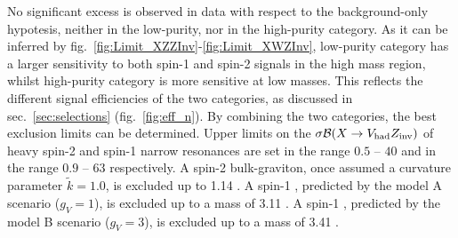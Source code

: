 \noindent No significant excess is observed in data with respect to the background-only hypotesis, neither in the low-purity, nor in the high-purity category. As it can be inferred by fig.~\ref{fig:Limit_XZZInv}-\ref{fig:Limit_XWZInv}, low-purity category has a larger sensitivity to both spin-1 and spin-2 signals in the high mass region, whilst high-purity category is more sensitive at low masses. This reflects the different signal efficiencies of the two categories, as discussed in sec.~\ref{sec:selections} (fig.~\ref{fig:eff_n}). By combining the two categories, the best exclusion limits can be determined. Upper limits on the $\sigma \mathcal{B} (X \rightarrow V_{\text{had}} Z_{\text{inv}})$ of heavy spin-2 and spin-1 narrow resonances are set in the range $0.5$ -- $40$ \fb and in the range $0.9$ -- $63$ \fb respectively. A spin-2 bulk-graviton, once assumed a curvature parameter $\tilde{k} = 1.0$, is excluded up to 1.14 \TeV. A spin-1 \Wp, predicted by the model A scenario ($g_V=1$), is excluded up to a mass of 3.11 \TeV. A spin-1 \Wp, predicted by the model B scenario ($g_V=3$), is excluded up to a mass of 3.41 \TeV. 


